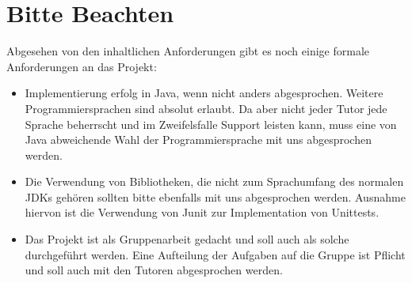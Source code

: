 \documentclass{programmierpraktikum}
\begin{document}
\section{Bitte Beachten}
Abgesehen von den inhaltlichen Anforderungen gibt es noch einige formale Anforderungen an das
Projekt:
\begin{itemize}
  \item Implementierung erfolg in Java, wenn nicht anders abgesprochen. Weitere Programmiersprachen sind absolut erlaubt. Da aber nicht jeder Tutor jede Sprache beherrscht und im Zweifelsfalle Support leisten kann, muss eine von Java abweichende Wahl der Programmiersprache mit uns abgesprochen werden.
  \item Die Verwendung von Bibliotheken, die nicht zum Sprachumfang des normalen JDKs gehören sollten bitte ebenfalls mit uns abgesprochen werden. Ausnahme hiervon ist die Verwendung von Junit zur Implementation von Unittests.
  \item Das Projekt ist als Gruppenarbeit gedacht und soll auch als solche durchgeführt werden.  Eine Aufteilung der Aufgaben auf die Gruppe ist Pflicht und soll auch mit den Tutoren abgesprochen werden.
\end{itemize}
\end{document}
